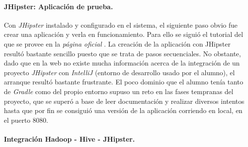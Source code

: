 \bigskip
\par
\paragraph*{JHipster: Aplicación de prueba.}

\par
Con \textit{JHipster} instalado y configurado en el sistema, el siguiente paso obvio fue crear una aplicación y verla en funcionamiento. Para ello se siguió el tutorial del que se provee en la \textit{página oficial} \cite{jhipster}. La creación de la aplicación con JHipster resultó bastante sencillo puesto que se trata de pasos secuenciales. No obstante, dado que en la web no existe mucha información acerca de la integración de un proyecto  \textit{JHipster} con \textit{IntelliJ} \cite{intellij} (entorno de desarrollo usado por el alumno), el arranque resultó bastante frustrante. El poco dominio que el alumno tenía tanto de \textit{Gradle} como del propio entorno supuso un reto en las fases tempranas del proyecto, que se superó a base de leer documentación y realizar diversos intentos hasta que por fin se consiguió una versión de la aplicación corriendo en local, en el puerto 8080. 

\bigskip
\par
\paragraph*{Integración Hadoop - Hive - JHipster.}

